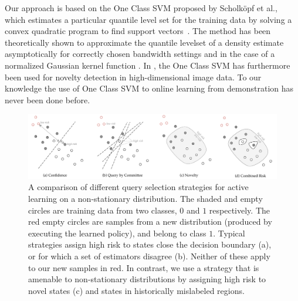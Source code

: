 \documentclass[10pt, conference]{ieeeconf}      %
\begin{document}
Our approach is based on the One Class SVM proposed by Scholk{\"o}pf et al., which estimates a particular quantile level set for the training data by solving a convex quadratic program  to find support
vectors~\cite{scholkopf2001estimating}. The method has been theoretically shown to approximate the quantile levelset of a density estimate
asymptotically for correctly chosen bandwidth settings and in the case of a normalized Gaussian kernel function \cite{vert2006consistency}. 
In \cite{liu2014unsupervised}, the One Class SVM has furthermore been used for novelty detection in high-dimensional image data. To our knowledge the use of One Class SVM to online learning from demonstration has never been done before. 
\begin{figure}[t]
\centering

\includegraphics[width=\textwidth]{figures/active_learning.pdf}

\caption{ A comparison of different query selection strategies for active learning on a non-stationary distribution. The shaded and empty circles are training data from two classes, $0$ and $1$ respectively. The red empty circles are samples from a new distribution (produced by executing the learned policy), and belong to class $1$. Typical strategies assign high risk to states close the decision boundary (a), or for which a set of estimators disagree (b). Neither of these apply to our new samples in red. In contrast, we use a strategy that is amenable to non-stationary distributions by assigning high risk to novel states (c) and states in historically mislabeled regions. 
}
\label{fig:support_example}
\end{figure}
\end{document}
